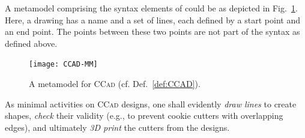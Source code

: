 A metamodel comprising the syntax elements of \CCAD could be as depicted in
Fig.~\ref{fig:PCAD-MM}. Here, a \CCAD drawing has a name and a set of lines, each
defined by a start point and an end point. The points between these two
points are not part of the \CCAD syntax as defined above.

\begin{figure}[t]
\centering
\texttt{[image: CCAD-MM]}
\caption{A metamodel for \textsc{CCad} (cf. Def.~\ref{def:CCAD}).}
\label{fig:PCAD-MM}%
\end{figure}

As minimal activities on \textsc{CCad} designs, one shall evidently \emph{draw
lines} to create shapes, \emph{check} their validity (e.g., to prevent cookie
cutters with overlapping edges), and ultimately \emph{3D print} the cutters
from the designs.




% 
% 
% 
% 
% 
% 
% 


